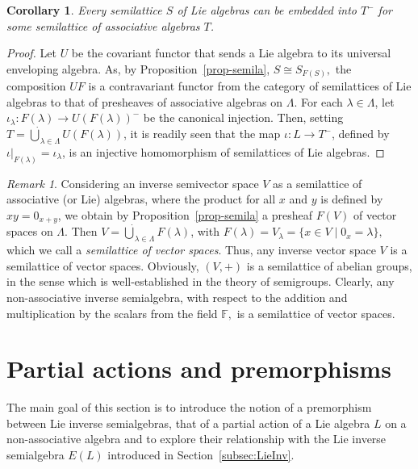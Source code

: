 \documentclass{amsart}
\newcommand{\F}{\mathbb{F}}
\newcommand{\0}{{\vartheta}}
\newtheorem{cor}[thm]{Corollary}
\theoremstyle{definition}
\theoremstyle{remark}
\newtheorem{rem}[thm]{Remark}
\numberwithin{equation}{section}
\newtheorem*{Theorem A}{\textbf{Theorem A}}
\newtheorem*{Corollary E}{\textbf{Corollary E}}
\newtheorem*{Corollary F}{\textbf{Corollary F}}
\newtheorem*{Theorem B}{\textbf{Theorem B}}
\newtheorem*{Theorem C}{\textbf{Theorem C}}
\newtheorem*{Theorem D}{\textbf{Theorem B}}
\newtheorem*{p a}{\textbf{Proof of  Theorem A}}
\newtheorem*{p b}{\textbf{Proof of Theorem B}}
\newtheorem*{p c}{\textbf{Proof of  Theorem C}}
\newtheorem*{p d}{\textbf{Proof of  Theorem D}}
\begin{document}
\begin{cor}\label{c: semillatice}
Every semilattice $S$ of Lie algebras can be embedded into $T^-$ for some semilattice of associative algebras $T$. 
\end{cor}
\begin{proof}
Let $U$ be the covariant functor that sends a Lie algebra to its universal enveloping algebra. As, by Proposition~\ref{prop-semila}, 
 $S\cong S_{F(S)},$ 
the composition $UF$ is a contravariant functor
from the category of semilattices of Lie algebras to that of presheaves  of associative algebras on $\Lambda .$
For each $\lambda\in \Lambda$, let $\iota_\lambda:F(\lambda)\to U(F(\lambda))^-$ be the canonical injection. Then, setting
 $T=
\dot{\bigcup}_{\lambda\in \Lambda} U(F(\lambda))$, it is readily seen   that  the map $\iota:L\to T^-$, defined by $\iota|_{F(\lambda)}=\iota_\lambda$, is an injective homomorphism of semilattices of Lie algebras. 
\end{proof}


\begin{rem}Considering an inverse semivector space $V$ as a semilattice of associative (or Lie) algebras, where the product for all $x$ and $y$ is defined by $xy=0_{x+y}$, we obtain by Proposition~\ref{prop-semila} a presheaf $F(V)$ of vector spaces on $\Lambda .$  Then 
 $V=
\dot{\bigcup}_{\lambda\in \Lambda} F(\lambda)$, with
$F(\lambda )= V_{\lambda}=\{ x\in V\mid 0_x=\lambda\},$ which we call a {\it semilattice of vector spaces}. Thus,  any inverse vector  space $V$ is a semilattice of vector spaces. Obviously,  $(V,+)$  is a semilattice 
of abelian groups, in the sense which is well-established in the theory of semigroups. Clearly, any
non-associative  inverse semialgebra, with respect to the addition and multiplication by the scalars from the field $\F ,$ is a  semilattice of vector spaces.
\end{rem}


\section{Partial actions and premorphisms}\label{s: partial actions}
The main goal of this section is to introduce the notion   of a premorphism between Lie inverse  semialgebras,  that of a partial action of a Lie algebra $L$ on a non-associative algebra and to explore their relationship with the Lie inverse semialgebra \( E(L) \) introduced in  Section~\ref{subsec:LieInv}. 
\end{document}
